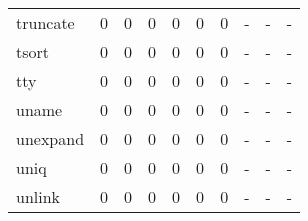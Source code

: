 \begin{longtable}{lp{1.3cm}p{1.3cm}p{1.3cm}p{1.3cm}p{1.3cm}p{1.3cm}p{1.3cm}p{1.3cm}p{1.3cm}}
truncate  &                      0 &                                  0 &                                 0 &                                0 &                                 0 &                               0 &                                    - &                                      - &                                    - \\
tsort     &                      0 &                                  0 &                                 0 &                                0 &                                 0 &                               0 &                                    - &                                      - &                                    - \\
tty       &                      0 &                                  0 &                                 0 &                                0 &                                 0 &                               0 &                                    - &                                      - &                                    - \\
uname     &                      0 &                                  0 &                                 0 &                                0 &                                 0 &                               0 &                                    - &                                      - &                                    - \\
unexpand  &                      0 &                                  0 &                                 0 &                                0 &                                 0 &                               0 &                                    - &                                      - &                                    - \\
uniq      &                      0 &                                  0 &                                 0 &                                0 &                                 0 &                               0 &                                    - &                                      - &                                    - \\
unlink    &                      0 &                                  0 &                                 0 &                                0 &                                 0 &                               0 &                                    - &                                      - &                                    - \\

\end{longtable}
